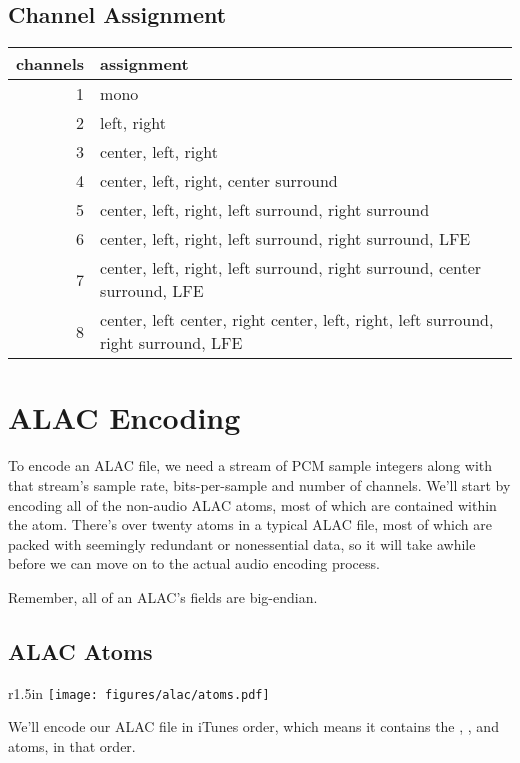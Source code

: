 \subsection{Channel Assignment}
\begin{table}[h]
\begin{tabular}{r|l}
channels & assignment \\
\hline
1 & mono \\
2 & left, right \\
3 & center, left, right \\
4 & center, left, right, center surround \\
5 & center, left, right, left surround, right surround \\
6 & center, left, right, left surround, right surround, LFE \\
7 & center, left, right, left surround, right surround, center surround, LFE \\
8 & center, left center, right center, left, right, left surround, right surround, LFE \\
\end{tabular}
\end{table}

\clearpage

\section{ALAC Encoding}

To encode an ALAC file, we need a stream of PCM sample integers
along with that stream's sample rate, bits-per-sample and number of
channels.
We'll start by encoding all of the non-audio ALAC atoms,
most of which are contained within the  atom.
There's over twenty atoms in a typical ALAC file,
most of which are packed with seemingly redundant or
nonessential data,
so it will take awhile before we can move on to the actual
audio encoding process.

Remember, all of an ALAC's fields are big-endian.

\subsection{ALAC Atoms}
\begin{wrapfigure}[6]{r}{1.5in}
\texttt{[image: figures/alac/atoms.pdf]}
\end{wrapfigure}
We'll encode our ALAC file in iTunes order, which means
it contains the , ,  and
 atoms, in that order.

